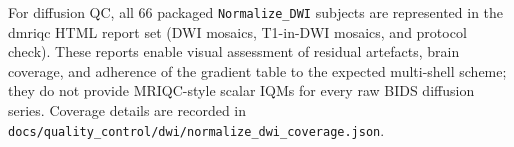 For diffusion QC, all 66 packaged \texttt{Normalize\_DWI} subjects are represented in the dmriqc HTML report set (DWI mosaics, T1-in-DWI mosaics, and protocol check). These reports enable visual assessment of residual artefacts, brain coverage, and adherence of the gradient table to the expected multi-shell scheme; they do not provide MRIQC-style scalar IQMs for every raw BIDS diffusion series. Coverage details are recorded in \texttt{docs/quality\_control/dwi/normalize\_dwi\_coverage.json}.


